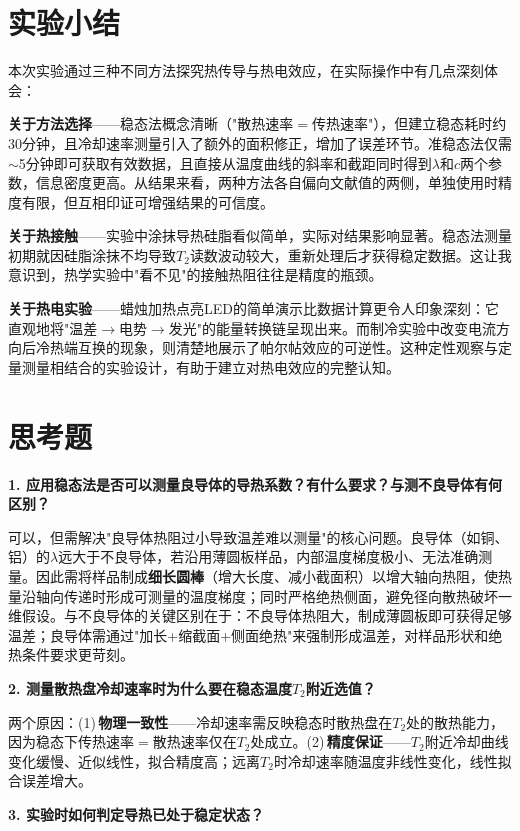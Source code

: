 \documentclass[UTF8]{article}
\begin{document}
\section{实验小结}

本次实验通过三种不同方法探究热传导与热电效应，在实际操作中有几点深刻体会：

\textbf{关于方法选择}——稳态法概念清晰（"散热速率$=$传热速率"），但建立稳态耗时约30分钟，且冷却速率测量引入了额外的面积修正，增加了误差环节。准稳态法仅需$\sim$5分钟即可获取有效数据，且直接从温度曲线的斜率和截距同时得到$\lambda$和$c$两个参数，信息密度更高。从结果来看，两种方法各自偏向文献值的两侧，单独使用时精度有限，但互相印证可增强结果的可信度。

\textbf{关于热接触}——实验中涂抹导热硅脂看似简单，实际对结果影响显著。稳态法测量初期就因硅脂涂抹不均导致$T_2$读数波动较大，重新处理后才获得稳定数据。这让我意识到，热学实验中"看不见"的接触热阻往往是精度的瓶颈。

\textbf{关于热电实验}——蜡烛加热点亮LED的简单演示比数据计算更令人印象深刻：它直观地将"温差$\to$电势$\to$发光"的能量转换链呈现出来。而制冷实验中改变电流方向后冷热端互换的现象，则清楚地展示了帕尔帖效应的可逆性。这种定性观察与定量测量相结合的实验设计，有助于建立对热电效应的完整认知。

\section{思考题}

\textbf{1. 应用稳态法是否可以测量良导体的导热系数？有什么要求？与测不良导体有何区别？}

可以，但需解决"良导体热阻过小导致温差难以测量"的核心问题。良导体（如铜、铝）的$\lambda$远大于不良导体，若沿用薄圆板样品，内部温度梯度极小、无法准确测量。因此需将样品制成\textbf{细长圆棒}（增大长度、减小截面积）以增大轴向热阻，使热量沿轴向传递时形成可测量的温度梯度；同时严格绝热侧面，避免径向散热破坏一维假设。与不良导体的关键区别在于：不良导体热阻大，制成薄圆板即可获得足够温差；良导体需通过"加长+缩截面+侧面绝热"来强制形成温差，对样品形状和绝热条件要求更苛刻。

\textbf{2. 测量散热盘冷却速率时为什么要在稳态温度$T_2$附近选值？}

两个原因：(1)\,\textbf{物理一致性}——冷却速率需反映稳态时散热盘在$T_2$处的散热能力，因为稳态下传热速率$=$散热速率仅在$T_2$处成立。(2)\,\textbf{精度保证}——$T_2$附近冷却曲线变化缓慢、近似线性，拟合精度高；远离$T_2$时冷却速率随温度非线性变化，线性拟合误差增大。

\textbf{3. 实验时如何判定导热已处于稳定状态？}
\end{document}
